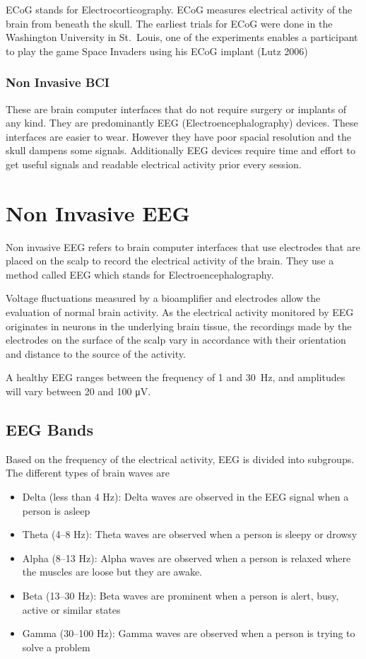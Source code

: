\documentclass[
  letterpaper,
  DIV=11,
  numbers=noendperiod]{scrreprt}
\begin{document}
ECoG stands for Electrocorticography. ECoG measures electrical activity
of the brain from beneath the skull. The earliest trials for ECoG were
done in the Washington University in St.~Louis, one of the experiments
enables a participant to play the game Space Invaders using his ECoG
implant (Lutz 2006)

\subsection{Non Invasive BCI}\label{non-invasive-bci}

These are brain computer interfaces that do not require surgery or
implants of any kind. They are predominantly EEG
(Electroencephalography) devices. These interfaces are easier to wear.
However they have poor spacial resolution and the skull dampens some
signals. Additionally EEG devices require time and effort to get useful
signals and readable electrical activity prior every session.

\chapter{Non Invasive EEG}\label{non-invasive-eeg}

Non invasive EEG refers to brain computer interfaces that use electrodes
that are placed on the scalp to record the electrical activity of the
brain. They use a method called EEG which stands for
Electroencephalography.

Voltage fluctuations measured by a bioamplifier and electrodes allow the
evaluation of normal brain activity. As the electrical activity
monitored by EEG originates in neurons in the underlying brain tissue,
the recordings made by the electrodes on the surface of the scalp vary
in accordance with their orientation and distance to the source of the
activity.

A healthy EEG ranges between the frequency of 1 and 30~Hz, and
amplitudes will vary between 20 and 100 μV.

\section{EEG Bands}\label{eeg-bands}

Based on the frequency of the electrical activity, EEG is divided into
subgroups. The different types of brain waves are

\begin{itemize}
\item
  Delta (less than 4 Hz): Delta waves are observed in the EEG signal
  when a person is asleep
\item
  Theta (4--8 Hz): Theta waves are observed when a person is sleepy or
  drowsy
\item
  Alpha (8--13 Hz): Alpha waves are observed when a person is relaxed
  where the muscles are loose but they are awake.
\item
  Beta (13--30 Hz): Beta waves are prominent when a person is alert,
  busy, active or similar states
\item
  Gamma (30--100 Hz): Gamma waves are observed when a person is trying
  to solve a problem
\end{itemize}
\end{document}
